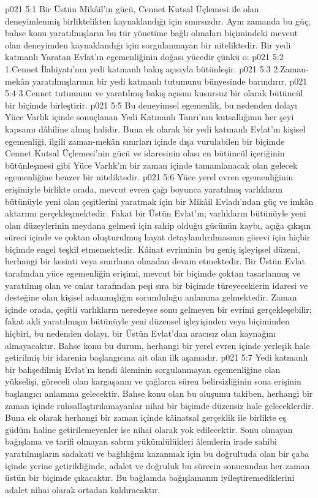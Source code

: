 \vs p021 5:1 Bir Üstün Mikâil’in gücü, Cennet Kutsal Üçlemesi ile olan deneyimlenmiş birliktelikten kaynaklandığı için sınırsızdır. Aynı zamanda bu güç, bahse konu yaratılmışların bu tür yönetime bağlı olmaları biçimindeki mevcut olan deneyimden kaynaklandığı için sorgulanmayan bir niteliktedir. Bir yedi katmanlı Yaratan Evlat’ın egemenliğinin doğası yücedir çünkü o:
\vs p021 5:2 1.\bibnobreakspace Cennet İlahiyatı’nın yedi katmanlı bakış açısıyla bütünleşir.
\vs p021 5:3 2.\bibnobreakspace Zaman\hyp{}mekân yaratılmışlarının bir yedi katmanlı tutumunu bünyesinde barındırır.
\vs p021 5:4 3.\bibnobreakspace Cennet tutumunu ve yaratılmış bakış açısını kusursuz bir olarak bütüncül bir biçimde birleştirir.
\vs p021 5:5 Bu deneyimsel egemenlik, bu nedenden dolayı Yüce Varlık içinde sonuçlanan Yedi Katmanlı Tanrı’nın kutsallığının her şeyi kapsamı dâhiline almış halidir. Buna ek olarak bir yedi katmanlı Evlat’ın kişisel egemenliği, ilgili zaman\hyp{}mekân sınırları içinde dışa vurulabilen bir biçimde Cennet Kutsal Üçlemesi’nin gücü ve idaresinin olası en bütüncül içeriğinin bütünleşmesi gibi Yüce Varlık’ın bir zaman içinde tamamlanacak olan gelecek egemenliğine benzer bir niteliktedir.
\vs p021 5:6 Yüce yerel evren egemenliğinin erişimiyle birlikte orada, mevcut evren çağı boyunca yaratılmış varlıkların bütünüyle yeni olan çeşitlerini yaratmak için bir Mikâil Evladı’ndan güç ve imkân aktarımı gerçekleşmektedir. Fakat bir Üstün Evlat’ın; varlıkların bütünüyle yeni olan düzeylerinin meydana gelmesi için sahip olduğu gücünün kaybı, açığa çıkışın süreci içinde ve çoktan oluşturulmuş hayat detaylandırılmasının görevi için hiçbir biçimde engel teşkil etmemektedir. Kâinat evriminin bu geniş işleyişsel düzeni, herhangi bir kesinti veya sınırlama olmadan devam etmektedir. Bir Üstün Evlat tarafından yüce egemenliğin erişimi, mevcut bir biçimde çoktan tasarlanmış ve yaratılmış olan ve onlar tarafından peşi sıra bir biçimde türeyeceklerin idaresi ve desteğine olan kişisel adanmışlığın sorumluluğu anlamına gelmektedir. Zaman içinde orada, çeşitli varlıkların neredeyse sonu gelmeyen bir evrimi gerçekleşebilir; fakat akli yaratılmışın bütünüyle yeni düzensel işleyişinden veya biçiminden hiçbiri, bu nedenden dolayı, bir Üstün Evlat’dan aracısız olan kaynağını almayacaktır. Bahse konu bu durum, herhangi bir yerel evren içinde yerleşik hale getirilmiş bir idarenin başlangıcına ait olan ilk aşamadır.
\vs p021 5:7 Yedi katmanlı bir bahşedilmiş Evlat’ın kendi âleminin sorgulanmayan egemenliğine olan yükselişi, göreceli olan kargaşanın ve çağlarca süren belirsizliğinin sona erişinin başlangıcı anlamına gelecektir. Bahse konu olan bu oluşumu takiben, herhangi bir zaman içinde ruhsallaştırılamayanlar nihai bir biçimde düzensiz hale geleceklerdir. Buna ek olarak herhangi bir zaman içinde kâinatsal gerçeklik ile birlikte eş güdüm haline getirilemeyenler ise nihai olarak yok edilecektir. Sonu olmayan bağışlama ve tarifi olmayan sabrın yükümlülükleri âlemlerin irade sahibi yaratılmışların sadakati ve bağlılığını kazanmak için bu doğrultuda olan bir çaba içinde yerine getirildiğinde, adalet ve doğruluk bu sürecin sonucundan her zaman üstün bir biçimde çıkacaktır. Bu bağlamda bağışlamanın iyileştiremediklerini adalet nihai olarak ortadan kaldıracaktır.
